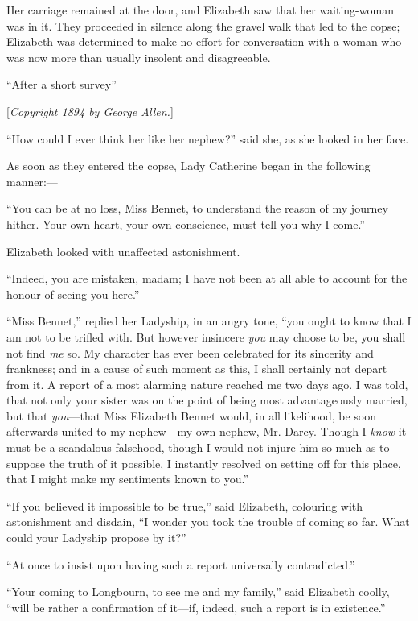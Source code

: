 \documentclass[12pt,openright]{book}
\begin{document}
Her carriage remained at the door, and Elizabeth saw that her waiting-woman was in it. They proceeded in silence along the gravel walk that led to the copse; Elizabeth was determined to make no effort for conversation with a woman who was now more than usually insolent and disagreeable.

“After a short survey”


[\textit{Copyright 1894 by George Allen.}]

“How could I ever think her like her nephew?” said she, as she looked in her face.

As soon as they entered the copse, Lady Catherine began in the following manner:—

“You can be at no loss, Miss Bennet, to understand the reason of my journey hither. Your own heart, your own conscience, must tell you why I come.”

Elizabeth looked with unaffected astonishment.

“Indeed, you are mistaken, madam; I have not been at all able to account for the honour of seeing you here.”

“Miss Bennet,” replied her Ladyship, in an angry tone, “you ought to know that I am not to be trifled with. But however insincere \textit{you} may choose to be, you shall not find \textit{me} so. My character has ever been celebrated for its sincerity and frankness; and in a cause of such moment as this, I shall certainly not depart from it. A report of a most alarming nature reached me two days ago. I was told, that not only your sister was on the point of being most advantageously married, but that \textit{you}—that Miss Elizabeth Bennet would, in all likelihood, be soon afterwards united to my nephew—my own nephew, Mr. Darcy. Though I \textit{know} it must be a scandalous falsehood, though I would not injure him so much as to suppose the truth of it possible, I instantly resolved on setting off for this place, that I might make my sentiments known to you.”

“If you believed it impossible to be true,” said Elizabeth, colouring with astonishment and disdain, “I wonder you took the trouble of coming so far. What could your Ladyship propose by it?”

“At once to insist upon having such a report universally contradicted.”

“Your coming to Longbourn, to see me and my family,” said Elizabeth coolly, “will be rather a confirmation of it—if, indeed, such a report is in existence.”
\end{document}
